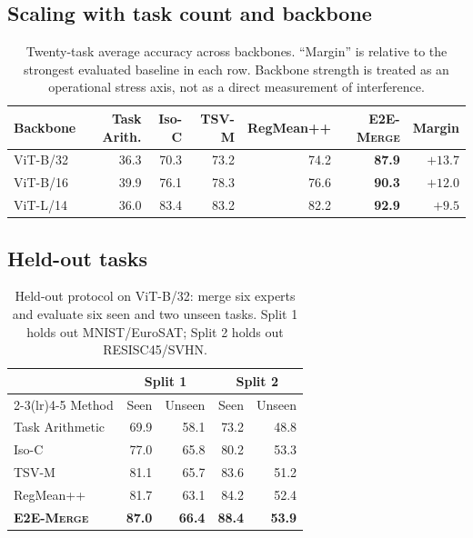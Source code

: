 \documentclass[letterpaper]{article} %
\newcommand{\method}{\textup{\textsc{E2E-Merge}}\xspace}
\theoremstyle{plain}
\theoremstyle{definition}
\begin{document}
\subsection{Scaling with task count and backbone}
\label{app:scaling}



\begin{table}[tb]
\centering
{\small
\begin{tabular}{lrrrrrr}
\toprule
Backbone & Task Arith. & Iso-C & TSV-M & RegMean++ & \method & Margin \\
\midrule
ViT-B/32 & 36.3 & 70.3 & 73.2 & 74.2 & \textbf{87.9} & $+13.7$ \\
ViT-B/16 & 39.9 & 76.1 & 78.3 & 76.6 & \textbf{90.3} & $+12.0$ \\
ViT-L/14 & 36.0 & 83.4 & 83.2 & 82.2 & \textbf{92.9} & $+9.5$ \\
\bottomrule
\end{tabular}
}
\caption{Twenty-task average accuracy across backbones. ``Margin'' is relative to the
strongest evaluated baseline in each row. Backbone strength is treated as an operational
stress axis, not as a direct measurement of interference.}
\label{tab:backbone-scaling}
\end{table}

\subsection{Held-out tasks}
\label{app:heldout}

\begin{table}[tb]
\centering
{\small
\begin{tabular*}{\columnwidth}{@{\extracolsep{\fill}}lrrrr}
\toprule
& \multicolumn{2}{c}{Split 1} & \multicolumn{2}{c}{Split 2} \\
\cmidrule(lr){2-3}\cmidrule(lr){4-5}
Method & Seen & Unseen & Seen & Unseen \\
\midrule
Task Arithmetic & 69.9 & 58.1 & 73.2 & 48.8 \\
Iso-C & 77.0 & 65.8 & 80.2 & 53.3 \\
TSV-M & 81.1 & 65.7 & 83.6 & 51.2 \\
RegMean++ & 81.7 & 63.1 & 84.2 & 52.4 \\
\textbf{\method} & \textbf{87.0} & \textbf{66.4} & \textbf{88.4} & \textbf{53.9} \\
\bottomrule
\end{tabular*}
}
\caption{Held-out protocol on ViT-B/32: merge six experts and evaluate six seen and two
unseen tasks. Split 1 holds out MNIST/EuroSAT; Split 2 holds out RESISC45/SVHN.}
\label{tab:heldout-app}
\end{table}
\end{document}
